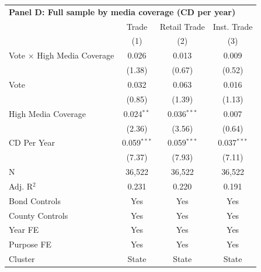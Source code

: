 \begingroup
\centering
\begin{tabular*}{\textwidth}{@{\extracolsep{\fill}}lccc}
\multicolumn{5}{l}{\textbf{Panel D: Full sample by media coverage (CD per year)}}\\

\addlinespace
   \toprule
                                      & Trade         & Retail Trade  & Inst. Trade\\  
                                      & (1)           & (2)           & (3)\\  
   \midrule 
   Vote $\times$ High Media Coverage  & 0.026         & 0.013         & 0.009\\   
                                      & (1.38)       & (0.67)       & (0.52)\\   
   Vote                               & 0.032         & 0.063         & 0.016\\   
                                      & (0.85)       & (1.39)       & (1.13)\\   
   High Media Coverage                & 0.024$^{**}$  & 0.036$^{***}$ & 0.007\\   
                                      & (2.36)       & (3.56)       & (0.64)\\   
   CD Per Year                        & 0.059$^{***}$ & 0.059$^{***}$ & 0.037$^{***}$\\   
                                      & (7.37)       & (7.93)       & (7.11)\\   
   \hline
   N                       & 36,522        & 36,522        & 36,522\\  
   Adj. R$^2$                     & 0.231         & 0.220         & 0.191\\  
   Bond Controls                      & Yes           & Yes           & Yes\\  
   County Controls                    & Yes           & Yes           & Yes\\  
   Year FE                            & Yes           & Yes           & Yes\\  
   Purpose FE                         & Yes           & Yes           & Yes\\  
   Cluster              & State & State & State\\  
   \bottomrule
\end{tabular*}
\par\endgroup
